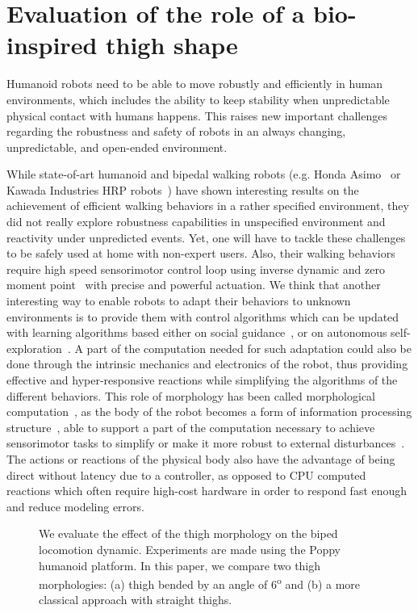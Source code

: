 
\section{Evaluation of the role of a bio-inspired thigh shape} %
\label{sec:evaluation-thigh}
Humanoid robots need to be able to move robustly and efficiently in human environments, which includes the ability to keep stability when unpredictable physical contact with humans happens. This raises new important challenges regarding the robustness and safety of robots in an always changing, unpredictable, and open-ended environment.

While state-of-art humanoid and bipedal walking robots (e.g. Honda Asimo~\cite{hirai1998development} or Kawada Industries HRP robots~\cite{kaneko2008humanoid}) have shown interesting results on the achievement of efficient walking behaviors in a rather specified environment, they did not really explore robustness capabilities in unspecified environment and reactivity under unpredicted events. Yet, one will have to tackle these challenges to be safely used at home with non-expert users. Also, their walking behaviors require high speed sensorimotor control loop using inverse dynamic and zero moment point~\cite{kajita2003biped} with precise and powerful actuation. We think that another interesting way to enable robots to adapt their behaviors to unknown environments is to provide them with control algorithms which can be updated with learning algorithms based either on social guidance~\cite{billard2008robot}, or on autonomous self-exploration~\cite{Baranes2012RAS}. A part of the computation needed for such adaptation could also be done through the intrinsic mechanics and electronics of the robot, thus providing effective and hyper-responsive reactions while simplifying the algorithms of the different behaviors. This role of morphology has been called morphological computation~\cite{pfeifer2005morphological}, as the body of the robot becomes a form of information processing structure~\cite{Pfeifer06}, able to support a part of the computation necessary to achieve sensorimotor tasks to simplify or make it more robust to external disturbances~\cite{Pfeifer07}. The actions or reactions of the physical body also have the advantage of being direct without latency due to a controller, as opposed to CPU computed reactions which often require high-cost hardware in order to respond fast enough and reduce modeling errors.


\begin{figure}[!t]
\centering
    \hfil
    \caption{We evaluate the effect of the thigh morphology on the biped locomotion dynamic. Experiments are made using the Poppy humanoid platform. In this paper, we compare two thigh morphologies: (a) thigh bended by an angle of 6\textsuperscript{o} and (b) a more classical approach with straight thighs.}
    \label{fig:poppy_compared}
\end{figure}

